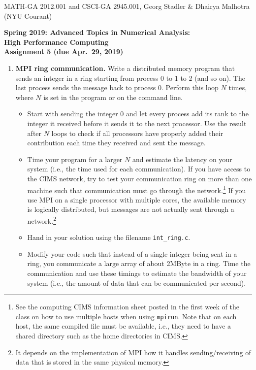 \documentclass[12pt]{article}
\begin{document}
\begin{center}
  \vspace*{-2cm}
{\small MATH-GA 2012.001 and CSCI-GA 2945.001, Georg Stadler \&
  Dhairya Malhotra (NYU Courant)}
\end{center}
\vspace*{.5cm}
\begin{center}
\large \textbf{%
Spring 2019: Advanced Topics in Numerical Analysis: \\
High Performance Computing \\
Assignment 5 (due Apr.\ 29, 2019) }
\end{center}



\begin{enumerate}

\item {\bf MPI ring communication.}  Write a distributed memory
  program that sends an integer in a ring starting from process 0 to 1
  to 2 (and so on). The last process sends the message back to process
  0. Perform this loop $N$ times, where $N$ is set in the program or
  on the command line.
  \begin{itemize}
  \item Start with sending the integer 0 and let every process add its
    rank to the integer it received before it sends it to the next
    processor. Use the result
    after $N$ loops to check if all processors have properly added
    their contribution each time they received and sent the message.
  \item Time your program for a larger $N$ and estimate the latency on
    your system (i.e., the time used for each communication).  If you
    have access to the CIMS network, try to test your communication
    ring on more than one machine such that communication must go
    through the network.\footnote{See the computing \@ CIMS
      information sheet posted in the first week of the class
      on how to use multiple hosts when using \texttt{mpirun}. Note
      that on each host, the same compiled file must be available,
      i.e., they need to have a shared directory such as the home
      directories in CIMS.} If you
    use MPI on a single processor with multiple cores, the available
    memory is logically distributed, but messages are not actually
    sent through a network.\footnote{It depends on the implementation
      of MPI how it handles sending/receiving of data that is stored
      in the same physical memory.}
  \item Hand in your solution using the filename \texttt{int\_ring.c}.
  \item Modify your code such that instead of a single integer being
    sent in a ring, you communicate a large array of about 2MByte in a
    ring. Time the communication and use these timings to estimate the
    bandwidth of your system (i.e., the amount of data that can be
    communicated per second).
  \end{itemize}



\end{enumerate}
\end{document}
